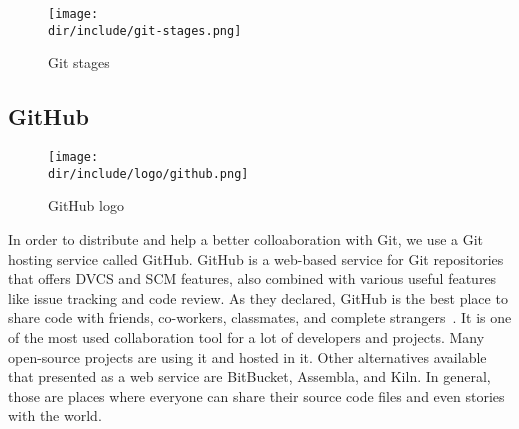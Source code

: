 \begin{figure}[htb]
    \centering
    \texttt{[image: \\dir/include/git-stages.png]}
    \caption{Git stages}
    \label{fig:git-stages}
\end{figure}

\subsection{GitHub}

\begin{wrapfigure}{r}{0.5\textwidth}
  \vspace{-20pt}
  \begin{center}
    \texttt{[image: \\dir/include/logo/github.png]}
  \end{center}
  \vspace{-20pt}
  \caption{GitHub logo}
  \label{fig:github-logo}
  \vspace{-10pt}
\end{wrapfigure}

In order to distribute and help a better colloaboration with Git, we use a Git hosting service called GitHub.
GitHub is a web-based service for Git repositories that offers \ac{DVCS} and \ac{SCM} features, also combined with various useful features like issue tracking and code review.
As they declared, GitHub is the best place to share code with friends, co-workers, classmates, and complete strangers~\autocite{GitHub2015}.
It is one of the most used collaboration tool for a lot of developers and projects.
Many open-source projects are using it and hosted in it.
Other alternatives available that presented as a web service are BitBucket, Assembla, and Kiln.
In general, those are places where everyone can share their source code files and even stories with the world.
